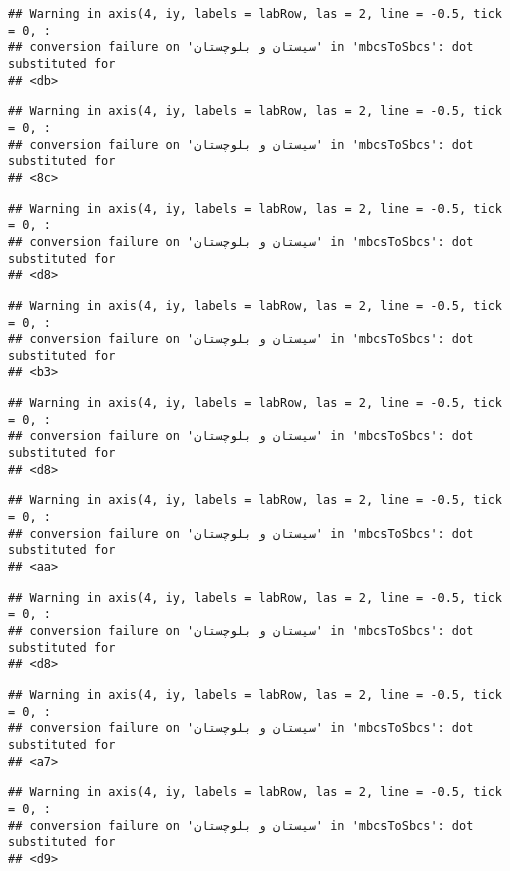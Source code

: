\documentclass[
]{article}
\begin{document}
\begin{verbatim}
## Warning in axis(4, iy, labels = labRow, las = 2, line = -0.5, tick = 0, :
## conversion failure on 'سیستان و بلوچستان' in 'mbcsToSbcs': dot substituted for
## <db>
\end{verbatim}

\begin{verbatim}
## Warning in axis(4, iy, labels = labRow, las = 2, line = -0.5, tick = 0, :
## conversion failure on 'سیستان و بلوچستان' in 'mbcsToSbcs': dot substituted for
## <8c>
\end{verbatim}

\begin{verbatim}
## Warning in axis(4, iy, labels = labRow, las = 2, line = -0.5, tick = 0, :
## conversion failure on 'سیستان و بلوچستان' in 'mbcsToSbcs': dot substituted for
## <d8>
\end{verbatim}

\begin{verbatim}
## Warning in axis(4, iy, labels = labRow, las = 2, line = -0.5, tick = 0, :
## conversion failure on 'سیستان و بلوچستان' in 'mbcsToSbcs': dot substituted for
## <b3>
\end{verbatim}

\begin{verbatim}
## Warning in axis(4, iy, labels = labRow, las = 2, line = -0.5, tick = 0, :
## conversion failure on 'سیستان و بلوچستان' in 'mbcsToSbcs': dot substituted for
## <d8>
\end{verbatim}

\begin{verbatim}
## Warning in axis(4, iy, labels = labRow, las = 2, line = -0.5, tick = 0, :
## conversion failure on 'سیستان و بلوچستان' in 'mbcsToSbcs': dot substituted for
## <aa>
\end{verbatim}

\begin{verbatim}
## Warning in axis(4, iy, labels = labRow, las = 2, line = -0.5, tick = 0, :
## conversion failure on 'سیستان و بلوچستان' in 'mbcsToSbcs': dot substituted for
## <d8>
\end{verbatim}

\begin{verbatim}
## Warning in axis(4, iy, labels = labRow, las = 2, line = -0.5, tick = 0, :
## conversion failure on 'سیستان و بلوچستان' in 'mbcsToSbcs': dot substituted for
## <a7>
\end{verbatim}

\begin{verbatim}
## Warning in axis(4, iy, labels = labRow, las = 2, line = -0.5, tick = 0, :
## conversion failure on 'سیستان و بلوچستان' in 'mbcsToSbcs': dot substituted for
## <d9>
\end{verbatim}
\end{document}
